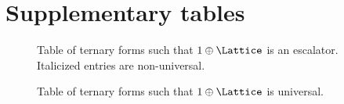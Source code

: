 \chapter*{Supplementary tables}
\label{appx:quaternary-escalators}


\begin{figure}
        
    \caption[
        Table of ternary forms such that \(1 \oplus \Lattice\) is an escalator.
    ]{Table of ternary forms such that \(1 \oplus \Lattice\) is an escalator. \cite[Table~3]{bhargava2000conway} Italicized entries are non-universal.}
\end{figure}

\clearpage

\begin{figure}
    
    \caption[
        Table of ternary forms such that \(1 \oplus \Lattice\) is universal.
    ]{Table of ternary forms such that \(1 \oplus \Lattice\) is universal. \cite[Table~5]{bhargava2000conway}}
\end{figure}
